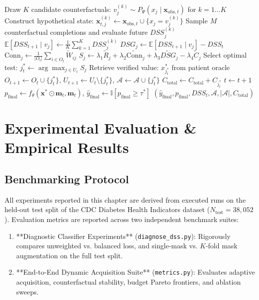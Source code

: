 \documentclass[11pt,a4paper]{report}
\begin{document}
\begin{algorithm}[htbp]
\begin{algorithmic}[1]
  \EndIf
    \State Draw $K$ candidate counterfactuals: $v_j^{(k)} \sim P_\Psi(x_j \mid \mathbf{x}_{\text{obs},t})$ for $k=1 \dots K$
      \State Construct hypothetical state: $\mathbf{x}_{t,j}^{(k)} \gets \mathbf{x}_{\text{obs},t} \cup \{x_j = v_j^{(k)}\}$
      \State Sample $M$ counterfactual completions and evaluate future $DSS_j^{(k)}$
    \EndFor
    \State $\mathbb{E}[DSS_{t+1} \mid v_j] \gets \frac{1}{K}\sum_{k=1}^K DSS_j^{(k)}$
    \State $DSG_j \gets \mathbb{E}[DSS_{t+1} \mid v_j] - DSS_t$
    \State $\text{Conn}_j \gets \frac{1}{|O_t|} \sum_{i \in O_t} \widetilde{W}_{ij}$
    \State $S_j \gets \lambda_1 \widetilde{R}_j + \lambda_2 \widetilde{\text{Conn}}_j + \lambda_3 \widetilde{DSG}_j - \lambda_4 \widetilde{C}_j$
  \EndFor
  \State Select optimal test: $j^*_t \gets \arg\max_{j \in U_t} S_j$
  \State Retrieve verified value: $x^*_{j^*_t}$ from patient oracle
  \State $O_{t+1} \gets O_t \cup \{j^*_t\}$, \quad $U_{t+1} \gets U_t \setminus \{j^*_t\}$, \quad $\mathcal{A} \gets \mathcal{A} \cup \{j^*_t\}$
  \State $C_{\text{total}} \gets C_{\text{total}} + C_{j^*_t}$
  \State $t \gets t + 1$
\EndWhile
\State $p_{\text{final}} \gets f_\theta(\mathbf{x}^* \odot \mathbf{m}_t, \mathbf{m}_t)$, \quad $\hat{y}_{\text{final}} \gets \mathbb{I}[p_{\text{final}} \ge \tau^*]$
\State \Return $(\hat{y}_{\text{final}}, p_{\text{final}}, DSS_t, \mathcal{A}, |\mathcal{A}|, C_{\text{total}})$
\end{algorithmic}
\end{algorithm}

\chapter{Experimental Evaluation \& Empirical Results}

\section{Benchmarking Protocol}
All experiments reported in this chapter are derived from executed runs on the held-out test split of the CDC Diabetes Health Indicators dataset ($N_{\text{test}} = 38,052$). Evaluation metrics are reported across two independent benchmark suites:
\begin{enumerate}[noitemsep]
  \item **Diagnostic Classifier Experiments** (\texttt{diagnose\_dss.py}): Rigorously compares unweighted vs. balanced loss, and single-mask vs. $K$-fold mask augmentation on the full test split.
  \item **End-to-End Dynamic Acquisition Suite** (\texttt{metrics.py}): Evaluates adaptive acquisition, counterfactual stability, budget Pareto frontiers, and ablation sweeps.
\end{enumerate}
\end{document}
